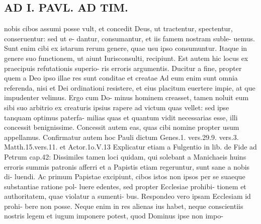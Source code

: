 \documentclass{article}
\begin{document}
\begin{pages}
\section*{AD I. PAVL. AD TIM. }
\marginpar{[ p.192 ]}nobis cibos assumi posse vult, et concedit Deus, ut tractentur, spectentur, conseruentur: sed ut e- dantur, consumantur, et iis famem nostram suble- uemus. Sunt enim cibi ex istarum rerum genere, quae usu ipso consumuntur. Itaque in genere suo functionem, ut aiunt Iurisconsulti, recipiunt. Est autem hic locus ex praecipuis refutationis superio- ris erroris argumentis. Ducitur a fine, propter quem a Deo ipso illae res sunt conditae et creatae Ad eum enim sunt omnia referenda, nisi et Dei ordinationi resistere, et eius placitum euertere impie, at que impudenter velimus. Ergo cum Do- minus hominem creasset, tamen noluit eum sibi suo arbitrio ex creaturis ipsius rapere ad victum quas vellet: sed ipse tanquam optimus paterfa- milias quas et quantum vidit necessarias esse, illi concessit benignissime. Concessit autem eas, quas cibi nomine propter usum appellamus. Confirmatur autem hoc Pauli dictum Genes.1. vers.29.9. vers.3. Matth.15.vers.11. et Actor.1o.V.13 Explicatur etiam a Fulgentio in lib. de Fide ad Petrum cap.42: Dissimiles tamen loci quidam, qui solebant a Manichaeis huins erroris summis patronis afferri et a Papistis etiam regeruntur, sunt sane a nobis di- luendi. Ac primum Papistae excipiunt, cibos istos non ipsos per se suaeque substantiae ratione pol- luere edentes, sed propter Ecclesiae prohibi- tionem et authoritatem, quae violatur a sumenti- bus. Respondeo vero ipsam Ecclesiam id prohi- bere non posse. Neque enim in res alienas ius habet, neque conscientiis nostris legem et iugum imponere potest, quod Dominus ipse non impo- 

\end{pages}
\end{document}
